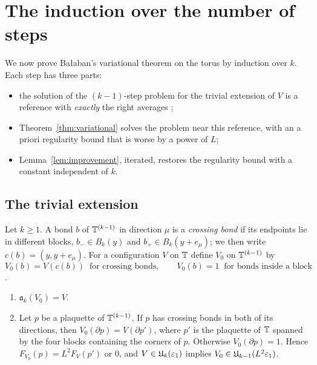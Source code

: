 \section{The induction over the number of steps}\label{sec:induction}

We now prove Ba\l aban's variational theorem on the torus by induction over $k$. Each step has three parts:
\begin{itemize}
\item the solution of the $(k-1)$-step problem for the trivial extension of $V$ is a reference with \emph{exactly} the right averages \cite[Sect.~A]{BalVar};
\item Theorem~\ref{thm:variational} solves the problem near this reference, with an a priori regularity bound that is worse by a power of $L$;
\item Lemma~\ref{lem:improvement}, iterated, restores the regularity bound with a constant independent of $k$.
\end{itemize}

\subsection{The trivial extension}

Let $k\ge1$. A bond $b$ of $\mathbb T^{(k-1)}$ in direction $\mu$ is a \emph{crossing bond} if its endpoints lie in different blocks, $b_-\in B_k(y)$ and $b_+\in B_k(y+e_\mu)$; we then write $c(b)=(y,y+e_\mu)$. For a configuration $V$ on $\mathbb T$ define $V_0$ on $\mathbb T^{(k-1)}$ by
\[
V_0(b)=V(c(b))\ \text{ for crossing bonds},\qquad V_0(b)=1\ \text{ for bonds inside a block}
\]
\cite[(11)]{BalVar}.

\begin{lemma}\label{lem:trivial-extension}
\begin{enumerate}[label=(\alph*)]
\item $\mathfrak a_k(V_0)=V$.
\item Let $p$ be a plaquette of $\mathbb T^{(k-1)}$. If $p$ has crossing bonds in both of its directions, then $V_0(\partial p)=V(\partial p')$, where $p'$ is the plaquette of $\mathbb T$ spanned by the four blocks containing the corners of $p$. Otherwise $V_0(\partial p)=1$. Hence $F_{V_0}(p)=L^2F_V(p')$ or $0$, and $V\in\mathfrak U_k(\varepsilon_1)$ implies $V_0\in\mathfrak U_{k-1}(L^2\varepsilon_1)$.
\end{enumerate}
\end{lemma}

